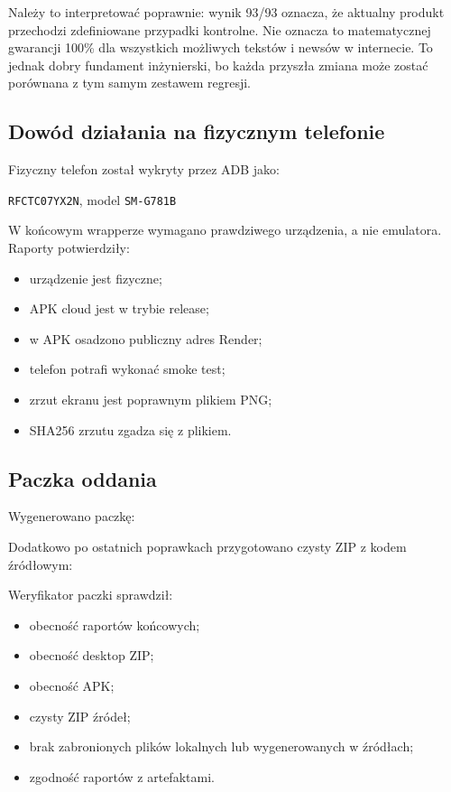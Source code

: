 \documentclass[12pt,a4paper]{article}
\begin{document}
Należy to interpretować poprawnie: wynik 93/93 oznacza, że aktualny produkt przechodzi zdefiniowane przypadki kontrolne.
Nie oznacza to matematycznej gwarancji 100\% dla wszystkich możliwych tekstów i newsów w internecie.
To jednak dobry fundament inżynierski, bo każda przyszła zmiana może zostać porównana z tym samym zestawem regresji.

\subsection{Dowód działania na fizycznym telefonie}
Fizyczny telefon został wykryty przez ADB jako:
\begin{center}
\texttt{RFCTC07YX2N}, model \texttt{SM-G781B}
\end{center}

W końcowym wrapperze wymagano prawdziwego urządzenia, a nie emulatora.
Raporty potwierdziły:
\begin{itemize}
  \item urządzenie jest fizyczne;
  \item APK cloud jest w trybie release;
  \item w APK osadzono publiczny adres Render;
  \item telefon potrafi wykonać smoke test;
  \item zrzut ekranu jest poprawnym plikiem PNG;
  \item SHA256 zrzutu zgadza się z plikiem.
\end{itemize}

\subsection{Paczka oddania}
Wygenerowano paczkę:
\begin{center}
\end{center}

Dodatkowo po ostatnich poprawkach przygotowano czysty ZIP z kodem źródłowym:
\begin{center}
\end{center}

Weryfikator paczki sprawdził:
\begin{itemize}
  \item obecność raportów końcowych;
  \item obecność desktop ZIP;
  \item obecność APK;
  \item czysty ZIP źródeł;
  \item brak zabronionych plików lokalnych lub wygenerowanych w źródłach;
  \item zgodność raportów z artefaktami.
\end{itemize}
\end{document}
